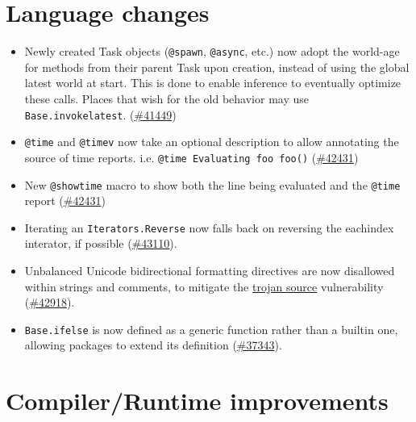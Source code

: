 \hypertarget{3442424987907572838}{}


\chapter{Language changes}



\begin{itemize}
\item Newly created Task objects (\texttt{@spawn}, \texttt{@async}, etc.) now adopt the world-age for methods from their parent Task upon creation, instead of using the global latest world at start. This is done to enable inference to eventually optimize these calls. Places that wish for the old behavior may use \texttt{Base.invokelatest}. (\href{https://github.com/JuliaLang/julia/issues/41449}{\#41449})


\item \texttt{@time} and \texttt{@timev} now take an optional description to allow annotating the source of time reports. i.e. \texttt{@time {\textquotedbl}Evaluating foo{\textquotedbl} foo()} (\href{https://github.com/JuliaLang/julia/issues/42431}{\#42431})


\item New \texttt{@showtime} macro to show both the line being evaluated and the \texttt{@time} report (\href{https://github.com/JuliaLang/julia/issues/42431}{\#42431})


\item Iterating an \texttt{Iterators.Reverse} now falls back on reversing the eachindex interator, if possible (\href{https://github.com/JuliaLang/julia/issues/43110}{\#43110}).


\item Unbalanced Unicode bidirectional formatting directives are now disallowed within strings and comments, to mitigate the \href{https://www.trojansource.codes}{{\textquotedbl}trojan source{\textquotedbl}} vulnerability (\href{https://github.com/JuliaLang/julia/issues/42918}{\#42918}).


\item \texttt{Base.ifelse} is now defined as a generic function rather than a builtin one, allowing packages to extend its definition (\href{https://github.com/JuliaLang/julia/issues/37343}{\#37343}).

\end{itemize}


\hypertarget{15772063917944537781}{}


\chapter{Compiler/Runtime improvements}



